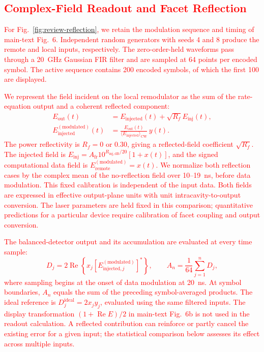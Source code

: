 \documentclass[
 aip,
 apl,
 amsmath,amssymb,
 preprint,
 floatfix,
]{revtex4-1}
\begin{document}
\clearpage
\subsection{\textcolor{red}{Complex-Field Readout and Facet Reflection}}
\textcolor{red}{For Fig.~\ref{fig:review-reflection}, we retain the modulation sequence and timing of main-text Fig.~6. Independent random generators with seeds 4 and 8 produce the remote and local inputs, respectively. The zero-order-held waveforms pass through a 20~GHz Gaussian FIR filter and are sampled at 64 points per encoded symbol. The active sequence contains 200 encoded symbols, of which the first 100 are displayed.}

\textcolor{red}{We represent the field incident on the local remodulator as the sum of the rate-equation output and a coherent reflected component:
\begin{equation}
\begin{aligned}
E_{\mathrm{out}}(t)&=E_{\mathrm{injected}}(t)+\sqrt{R_f}E_{\mathrm{inj}}(t),\\
E_{\mathrm{injected}}^{(\mathrm{modulated})}(t)
&=\frac{E_{\mathrm{out}}(t)}{\langle E_{\mathrm{injected}}\rangle_{\mathrm{CW}}}\,y(t).
\end{aligned}
\end{equation}
The power reflectivity is $R_f=0$ or 0.30, giving a reflected-field coefficient $\sqrt{R_f}$. The injected field is $E_{\mathrm{inj}}=A_{\mathrm{fr}}10^{R_{\mathrm{inj,dB}}/20}[1+x(t)]$, and the signed computational data field is $E_{\mathrm{remote}}^{(\mathrm{modulated})}=x(t)$. We normalize both reflection cases by the complex mean of the no-reflection field over 10--19~ns, before data modulation. This fixed calibration is independent of the input data. Both fields are expressed in effective output-plane units with unit intracavity-to-output conversion. The laser parameters are held fixed in this comparison; quantitative predictions for a particular device require calibration of facet coupling and output conversion.}

\textcolor{red}{The balanced-detector output and its accumulation are evaluated at every time sample:
\begin{equation}
D_j=2\operatorname{Re}\!\left\{x_j\left[E_{\mathrm{injected},j}^{(\mathrm{modulated})}\right]^*\right\},
\qquad A_n=\frac{1}{64}\sum_{j=1}^{n}D_j,
\end{equation}
where sampling begins at the onset of data modulation at 20~ns. At symbol boundaries, $A_n$ equals the sum of the preceding symbol-averaged products. The ideal reference is $D_j^{\mathrm{ideal}}=2x_jy_j$, evaluated using the same filtered inputs. The display transformation $(1+\operatorname{Re}E)/2$ in main-text Fig.~6b is not used in the readout calculation. A reflected contribution can reinforce or partly cancel the existing error for a given input; the statistical comparison below assesses its effect across multiple inputs.}
\end{document}
